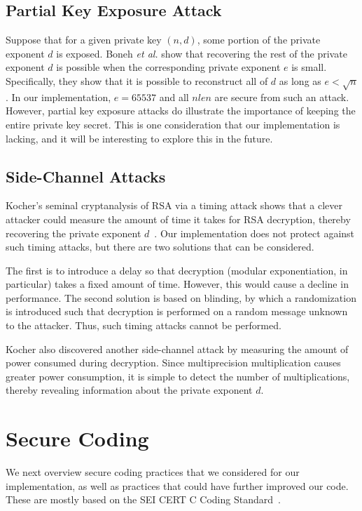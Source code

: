 \documentclass[a4paper]{article}
\begin{document}
\subsection{Partial Key Exposure Attack}

Suppose that for a given private key $(n,d)$, some portion of the private exponent $d$ is exposed. Boneh \emph{et al.} show that recovering the rest of the private exponent $d$ is possible when the corresponding private exponent $e$ is small. Specifically, they show that it is possible to reconstruct all of $d$ as long as $e < \sqrt{n}$. In our implementation, $e = 65537$ and all $nlen$ are secure from such an attack. However, partial key exposure attacks do illustrate the importance
of keeping the entire private key secret. This is one consideration that our implementation is lacking, and it will be interesting to explore this in the future.

\subsection{Side-Channel Attacks}

Kocher's seminal cryptanalysis of RSA via a timing attack shows that a clever attacker could measure the amount of time it takes for RSA decryption, thereby recovering the private exponent $d$~\cite{kocher1996timing}. Our implementation does not protect against such timing attacks, but there are two solutions that can be considered.

The first is to introduce a delay so that decryption (modular exponentiation, in particular) takes a fixed amount of time. However, this would cause a decline in performance. The second solution is based on blinding, by which a randomization is introduced such that decryption is performed on a random message unknown to the attacker. Thus, such timing attacks cannot be performed.

Kocher also discovered another side-channel attack by measuring the amount of power consumed during decryption. Since multiprecision multiplication causes greater power consumption, it is simple to detect the number of multiplications, thereby revealing information about the private exponent $d$. 

\section{Secure Coding}

We next overview secure coding practices that we considered for our implementation, as well as practices that could have further improved our code. These are mostly based on the SEI CERT C Coding Standard~\cite{seacord2008cert}.
\end{document}
